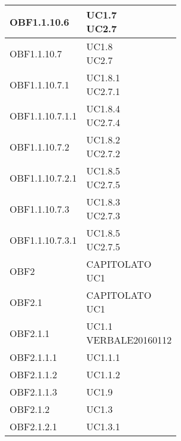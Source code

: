 \documentclass{scalatekids-article}
\begin{document}
\begin{longtable}[H]{|p{5.5cm}|p{5.5cm}|}
\hline
OBF1.1.10.6 & \multiLineCell[t]{UC1.7\\UC2.7\\}\\
\hline
OBF1.1.10.7 & \multiLineCell[t]{UC1.8\\UC2.7\\}\\
\hline
OBF1.1.10.7.1 & \multiLineCell[t]{UC1.8.1\\UC2.7.1\\}\\
\hline
OBF1.1.10.7.1.1 & \multiLineCell[t]{UC1.8.4\\UC2.7.4\\}\\
\hline
OBF1.1.10.7.2 & \multiLineCell[t]{UC1.8.2\\UC2.7.2\\}\\
\hline
OBF1.1.10.7.2.1 & \multiLineCell[t]{UC1.8.5\\UC2.7.5\\}\\
\hline
OBF1.1.10.7.3 & \multiLineCell[t]{UC1.8.3\\UC2.7.3\\}\\
\hline
OBF1.1.10.7.3.1 & \multiLineCell[t]{UC1.8.5\\UC2.7.5\\}\\
\hline
OBF2 & \multiLineCell[t]{CAPITOLATO\\UC1\\}\\
\hline
OBF2.1 & \multiLineCell[t]{CAPITOLATO\\UC1\\}\\
\hline
OBF2.1.1 & \multiLineCell[t]{UC1.1\\VERBALE20160112\\}\\
\hline
OBF2.1.1.1 & \multiLineCell[t]{UC1.1.1\\}\\
\hline
OBF2.1.1.2 & \multiLineCell[t]{UC1.1.2\\}\\
\hline
OBF2.1.1.3 & \multiLineCell[t]{UC1.9\\}\\
\hline
OBF2.1.2 & \multiLineCell[t]{UC1.3\\}\\
\hline
OBF2.1.2.1 & \multiLineCell[t]{UC1.3.1\\}\\

\end{longtable}
\end{document}

